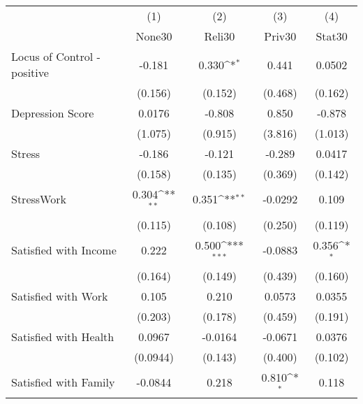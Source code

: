 {
\def\sym#1{\ifmmode^{#1}\else\(^{#1}\)\fi}
\begin{tabular}{l*{4}{c}}
\hline\hline
            &\multicolumn{1}{c}{(1)}&\multicolumn{1}{c}{(2)}&\multicolumn{1}{c}{(3)}&\multicolumn{1}{c}{(4)}\\
            &\multicolumn{1}{c}{None30}&\multicolumn{1}{c}{Reli30}&\multicolumn{1}{c}{Priv30}&\multicolumn{1}{c}{Stat30}\\
\hline
Locus of Control - positive&      -0.181         &       0.330\sym{*}  &       0.441         &      0.0502         \\
            &     (0.156)         &     (0.152)         &     (0.468)         &     (0.162)         \\
[1em]
Depression Score&      0.0176         &      -0.808         &       0.850         &      -0.878         \\
            &     (1.075)         &     (0.915)         &     (3.816)         &     (1.013)         \\
[1em]
Stress      &      -0.186         &      -0.121         &      -0.289         &      0.0417         \\
            &     (0.158)         &     (0.135)         &     (0.369)         &     (0.142)         \\
[1em]
StressWork  &       0.304\sym{**} &       0.351\sym{**} &     -0.0292         &       0.109         \\
            &     (0.115)         &     (0.108)         &     (0.250)         &     (0.119)         \\
[1em]
Satisfied with Income&       0.222         &       0.500\sym{***}&     -0.0883         &       0.356\sym{*}  \\
            &     (0.164)         &     (0.149)         &     (0.439)         &     (0.160)         \\
[1em]
Satisfied with Work&       0.105         &       0.210         &      0.0573         &      0.0355         \\
            &     (0.203)         &     (0.178)         &     (0.459)         &     (0.191)         \\
[1em]
Satisfied with Health&      0.0967         &     -0.0164         &     -0.0671         &      0.0376         \\
            &    (0.0944)         &     (0.143)         &     (0.400)         &     (0.102)         \\
[1em]
Satisfied with Family&     -0.0844         &       0.218         &       0.810\sym{*}  &       0.118         \\

\end{tabular}}
